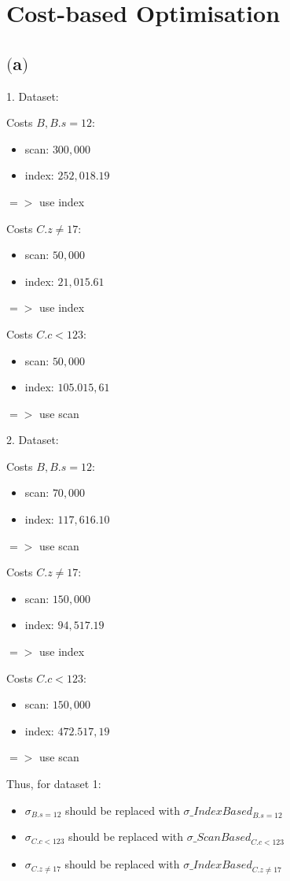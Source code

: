 



\section{Cost-based Optimisation}	
	
\subsection{$($a$)$}

1. Dataset:

Costs $B, B.s = 12$:
\begin{itemize}
	\item scan: $300,000$
	\item index: $252,018.19$
\end{itemize}
$=>$ use index

Costs $C.z \neq 17$:
\begin{itemize}
	\item scan: $50,000$
	\item index: $21,015.61$
\end{itemize}
$=>$ use index

Costs $C.c < 123$:
\begin{itemize}
	\item scan: $50,000$
	\item index: $105.015,61$
\end{itemize}
$=>$ use scan


2. Dataset:

Costs $B, B.s = 12$:
\begin{itemize}
	\item scan: $70,000$
	\item index: $117,616.10$
\end{itemize}
$=>$ use scan

Costs $C.z \neq 17$:
\begin{itemize}
	\item scan: $150,000$
	\item index: $94,517.19$
\end{itemize}
$=>$ use index

Costs $C.c < 123$:
\begin{itemize}
	\item scan: $150,000$
	\item index: $472.517,19$
\end{itemize}
$=>$ use scan


Thus, for dataset 1:
\begin{itemize}
	\item ${\sigma}_{B.s=12}$ should be replaced with ${\sigma \_IndexBased}_{B.s=12}$
	\item ${\sigma}_{C.c<123}$ should be replaced with ${\sigma \_ScanBased}_{C.c<123}$
	\item ${\sigma}_{C.z \neq 17}$ should be replaced with ${\sigma \_IndexBased}_{C.z \neq 17}$
\end{itemize}


